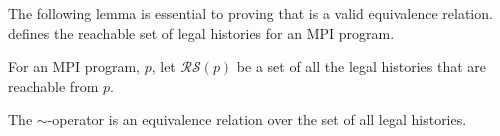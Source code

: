 The following lemma is essential to proving that  is a valid equivalence relation.  defines the reachable set of legal histories for an MPI program.

\begin{definition}\label{def:reachable}
For an MPI program, $\mathit{p}$, let $\mathcal{RS}(\mathit{p})$ be a set of all the legal histories that are reachable from $\mathit{p}$.
\end{definition}

\begin{lemma}\label{lemma:rst}
The $\sim$-operator is an equivalence relation over the set of all legal histories.
\end{lemma}

